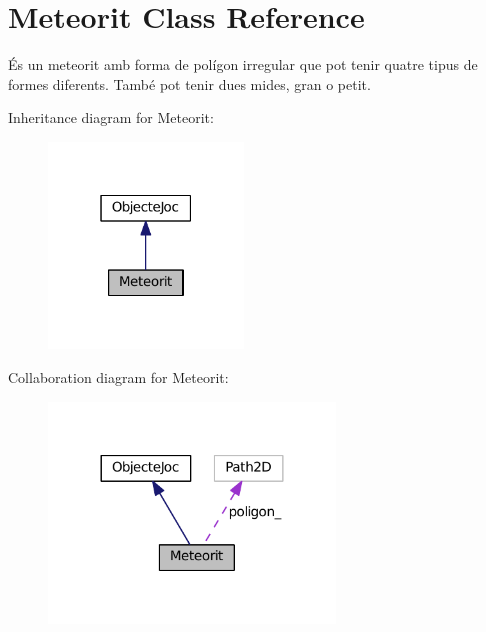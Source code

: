 \hypertarget{class_meteorit}{}\section{Meteorit Class Reference}
\label{class_meteorit}


És un meteorit amb forma de polígon irregular que pot tenir quatre tipus de formes diferents. També pot tenir dues mides, gran o petit.  




Inheritance diagram for Meteorit\+:\nopagebreak
\begin{figure}[H]
\begin{center}
\leavevmode
\includegraphics[width=147pt]{class_meteorit__inherit__graph}
\end{center}
\end{figure}


Collaboration diagram for Meteorit\+:\nopagebreak
\begin{figure}[H]
\begin{center}
\leavevmode
\includegraphics[width=216pt]{class_meteorit__coll__graph}
\end{center}
\end{figure}
